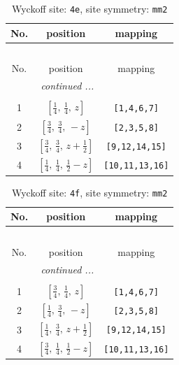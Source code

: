 \documentclass[fleqn,8pt]{jsarticle}
\begin{document}
\begin{longtable}{ccc}
\caption{Wyckoff site: {\tt 4e}, site symmetry: {\tt mm2}}
 \\
 \hline \hline
No. & position & mapping \\ \hline \endfirsthead

\multicolumn{2}{l}{\tablename\ \thetable{}} \\
 \hline \hline
No. & position & mapping \\ \hline \endhead

 \hline \hline
\multicolumn{2}{r}{\footnotesize\it continued ...} \\ \endfoot

 \hline \hline
\multicolumn{2}{r}{} \\ \endlastfoot

1 & $\left[ \frac{1}{4},\, \frac{1}{4},\, z \right]$ & {\tt [1,4,6,7]} \\ \hline
2 & $\left[ \frac{3}{4},\, \frac{3}{4},\, - z \right]$ & {\tt [2,3,5,8]} \\ \hline
3 & $\left[ \frac{3}{4},\, \frac{3}{4},\, z + \frac{1}{2} \right]$ & {\tt [9,12,14,15]} \\ \hline
4 & $\left[ \frac{1}{4},\, \frac{1}{4},\, \frac{1}{2} - z \right]$ & {\tt [10,11,13,16]} \\
\end{longtable}
\renewcommand{\arraystretch}{1.2}
\begin{longtable}{ccc}
\caption{Wyckoff site: {\tt 4f}, site symmetry: {\tt mm2}}
 \\
 \hline \hline
No. & position & mapping \\ \hline \endfirsthead

\multicolumn{2}{l}{\tablename\ \thetable{}} \\
 \hline \hline
No. & position & mapping \\ \hline \endhead

 \hline \hline
\multicolumn{2}{r}{\footnotesize\it continued ...} \\ \endfoot

 \hline \hline
\multicolumn{2}{r}{} \\ \endlastfoot

1 & $\left[ \frac{3}{4},\, \frac{1}{4},\, z \right]$ & {\tt [1,4,6,7]} \\ \hline
2 & $\left[ \frac{1}{4},\, \frac{3}{4},\, - z \right]$ & {\tt [2,3,5,8]} \\ \hline
3 & $\left[ \frac{1}{4},\, \frac{3}{4},\, z + \frac{1}{2} \right]$ & {\tt [9,12,14,15]} \\ \hline
4 & $\left[ \frac{3}{4},\, \frac{1}{4},\, \frac{1}{2} - z \right]$ & {\tt [10,11,13,16]} \\
\end{longtable}
\end{document}
